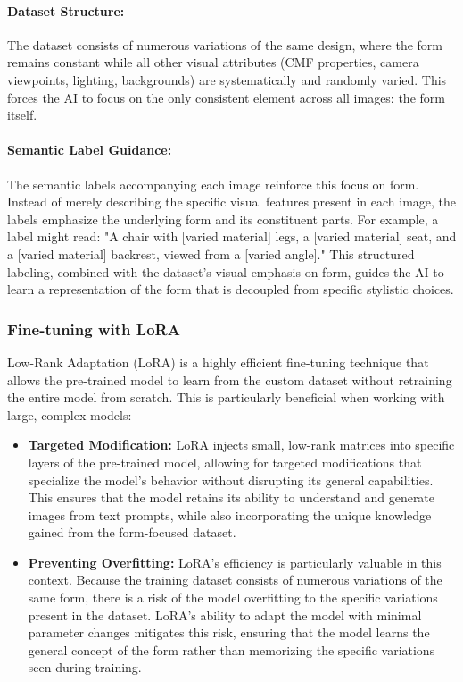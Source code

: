 \documentclass{article}
\begin{document}
\begin{itemize}
\paragraph{Dataset Structure:} The dataset consists of numerous variations of the same design, where the form remains constant while all other visual attributes (CMF properties, camera viewpoints, lighting, backgrounds) are systematically and randomly varied. This forces the AI to focus on the only consistent element across all images: the form itself.

\paragraph{Semantic Label Guidance:} The semantic labels accompanying each image reinforce this focus on form. Instead of merely describing the specific visual features present in each image, the labels emphasize the underlying form and its constituent parts. For example, a label might read: "A chair with [varied material] legs, a [varied material] seat, and a [varied material] backrest, viewed from a [varied angle]." This structured labeling, combined with the dataset's visual emphasis on form, guides the AI to learn a representation of the form that is decoupled from specific stylistic choices.

\subsubsection{Fine-tuning with LoRA}
Low-Rank Adaptation (LoRA) is a highly efficient fine-tuning technique that allows the pre-trained model to learn from the custom dataset without retraining the entire model from scratch. This is particularly beneficial when working with large, complex models:

\begin{itemize}
    \item \textbf{Targeted Modification:} LoRA injects small, low-rank matrices into specific layers of the pre-trained model, allowing for targeted modifications that specialize the model's behavior without disrupting its general capabilities. This ensures that the model retains its ability to understand and generate images from text prompts, while also incorporating the unique knowledge gained from the form-focused dataset.
    \item \textbf{Preventing Overfitting:} LoRA's efficiency is particularly valuable in this context. Because the training dataset consists of numerous variations of the same form, there is a risk of the model overfitting to the specific variations present in the dataset. LoRA's ability to adapt the model with minimal parameter changes mitigates this risk, ensuring that the model learns the general concept of the form rather than memorizing the specific variations seen during training.
\end{itemize}


\end{itemize}
\end{document}
